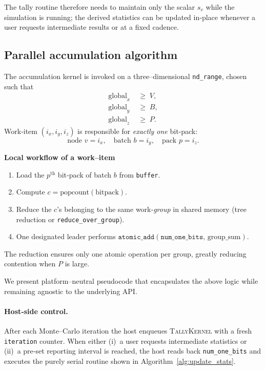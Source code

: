 The tally routine therefore needs to maintain only the scalar
\(s_v\) while the simulation is running; the derived statistics can be updated
in‑place whenever a user requests intermediate results or at a fixed cadence.

\subsection{Parallel accumulation algorithm}

The accumulation kernel is invoked on a three–dimensional
\texttt{nd\_range}, chosen such that
\[
  \begin{aligned}
    \text{global}_x &\;\ge\; V,\\
    \text{global}_y &\;\ge\; B,\\
    \text{global}_z &\;\ge\; P.
  \end{aligned}
\]
Work‑item \((i_x,i_y,i_z)\) is responsible for \emph{exactly one} bit‑pack:
\[
  \text{node  } v=i_x,\quad
  \text{batch } b=i_y,\quad
  \text{pack  } p=i_z.
\]

\vspace{4pt}
\noindent
\textbf{Local workflow of a work–item}
\begin{enumerate}
    \item Load the \(p^{\text{th}}\) bit‑pack of batch \(b\) from
          \texttt{buffer}.
    \item Compute \(c=\mathrm{popcount}(\text{bitpack})\).
    \item Reduce the \(c\)’s belonging to the same work‑\emph{group} in
          shared memory (tree reduction or \texttt{reduce\_over\_group}).
    \item One designated leader performs
          \(\texttt{atomic\_add}(\texttt{num\_one\_bits},\,\text{group\_sum})\).
\end{enumerate}

The reduction ensures only one atomic operation per group, greatly reducing
contention when \(P\) is large.

We present platform–neutral pseudocode that encapsulates the above logic while remaining agnostic to the underlying API.

\paragraph{Host‑side control.}
After each Monte–Carlo iteration the host enqueues \textsc{TallyKernel} with a
fresh \texttt{iteration} counter.  When either (i)~a user requests
intermediate statistics or (ii)~a pre‑set reporting interval is reached,
the host reads back \texttt{num\_one\_bits} and executes the purely
serial routine shown in Algorithm~\ref{alg:update_stats}.

